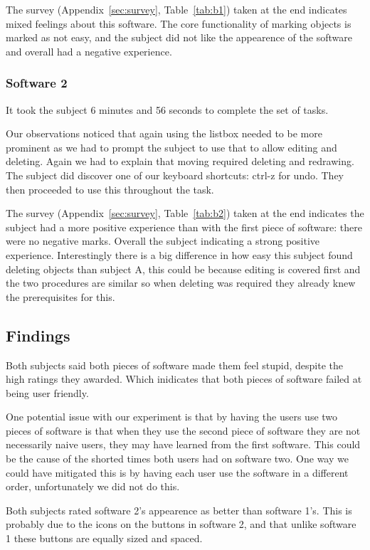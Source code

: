 \documentclass[a4paper,11pt,oneside]{article}
\begin{document}
The survey (Appendix~\ref{sec:survey}, Table~\ref{tab:b1}) taken at the end indicates mixed feelings about this software.  The core functionality of marking objects is marked as not easy, and the subject did not like the appearence of the software and overall had a negative experience.


\subsubsection{Software 2}
It took the subject 6 minutes and 56 seconds to complete the set of tasks.

Our observations noticed that again using the listbox needed to be more prominent as we had to prompt the subject to use that to allow editing and deleting.  Again we had to explain that moving required deleting and redrawing.  The subject did discover one of our keyboard shortcuts: ctrl-z for undo.  They then proceeded to use this throughout the task.

The survey (Appendix~\ref{sec:survey}, Table~\ref{tab:b2}) taken at the end indicates the subject had a more positive experience than with the first piece of software: there were no negative marks.  Overall the subject indicating a strong positive experience.  Interestingly there is a big difference in how easy this subject found deleting objects than subject A, this could be because editing is covered first and the two procedures are similar so when deleting was required they already knew the prerequisites for this.

\subsection{Findings}
Both subjects said both pieces of software made them feel stupid, despite the high ratings they awarded.  Which inidicates that both pieces of software failed at being user friendly.

One potential issue with our experiment is that by having the users use two pieces of software is that when they use the second piece of software they are not necessarily naive users, they may have learned from the first software.  This could be the cause of the shorted times both users had on software two.  One way we could have mitigated this is by having each user use the software in a different order, unfortunately we did not do this.

Both subjects rated software 2's appearence as better than software 1's.  This is probably due to the icons on the buttons in software 2, and that unlike software 1 these buttons are equally sized and spaced.
\end{document}
